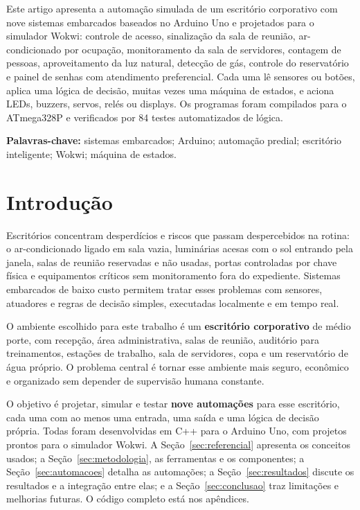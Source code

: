 \documentclass[12pt]{article}
\begin{document}
\begin{resumo}
Este artigo apresenta a automação simulada de um escritório corporativo com nove sistemas embarcados baseados no Arduino Uno e projetados para o simulador Wokwi: controle de acesso, sinalização da sala de reunião, ar-condicionado por ocupação, monitoramento da sala de servidores, contagem de pessoas, aproveitamento da luz natural, detecção de gás, controle do reservatório e painel de senhas com atendimento preferencial. Cada uma lê sensores ou botões, aplica uma lógica de decisão, muitas vezes uma máquina de estados, e aciona LEDs, buzzers, servos, relés ou displays. Os programas foram compilados para o ATmega328P e verificados por 84 testes automatizados de lógica.
\end{resumo}

\noindent\textbf{Palavras-chave:} sistemas embarcados; Arduino; automação predial; escritório inteligente; Wokwi; máquina de estados.

\section{Introdução}

Escritórios concentram desperdícios e riscos que passam despercebidos na rotina: o ar-condicionado ligado em sala vazia, luminárias acesas com o sol entrando pela janela, salas de reunião reservadas e não usadas, portas controladas por chave física e equipamentos críticos sem monitoramento fora do expediente. Sistemas embarcados de baixo custo permitem tratar esses problemas com sensores, atuadores e regras de decisão simples, executadas localmente e em tempo real.

O ambiente escolhido para este trabalho é um \textbf{escritório corporativo} de médio porte, com recepção, área administrativa, salas de reunião, auditório para treinamentos, estações de trabalho, sala de servidores, copa e um reservatório de água próprio. O problema central é tornar esse ambiente mais seguro, econômico e organizado sem depender de supervisão humana constante.

O objetivo é projetar, simular e testar \textbf{nove automações} para esse escritório, cada uma com ao menos uma entrada, uma saída e uma lógica de decisão própria. Todas foram desenvolvidas em C++ para o Arduino Uno, com projetos prontos para o simulador Wokwi. A Seção~\ref{sec:referencial} apresenta os conceitos usados; a Seção~\ref{sec:metodologia}, as ferramentas e os componentes; a Seção~\ref{sec:automacoes} detalha as automações; a Seção~\ref{sec:resultados} discute os resultados e a integração entre elas; e a Seção~\ref{sec:conclusao} traz limitações e melhorias futuras. O código completo está nos apêndices.
\end{document}
